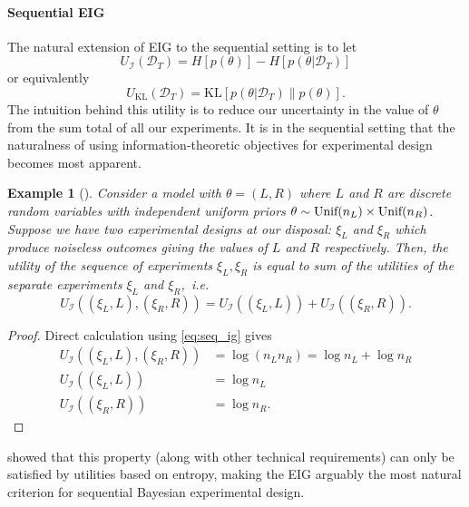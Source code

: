 \documentclass[a4paper, 10pt]{report}
\theoremstyle{plain}
\newtheorem{example}[theorem]{Example}
\begin{document}
	\paragraph{Sequential EIG}
	The natural extension of EIG to the sequential setting is to let \citep{foster2021dad}
	\begin{equation}
	\label{eq:seq_ig}
	U_\mathcal{I}(\mathcal{D}_T) = H[p(\theta)] - H[p(\theta|\mathcal{D}_T)]
	\end{equation}
	or equivalently \citep{huan2016sequential}
	\begin{equation}
	U_\text{KL}(\mathcal{D}_T) = \text{KL}[p(\theta|\mathcal{D}_T) \| p(\theta)].
	\end{equation}
	The intuition behind this utility is to reduce our uncertainty in the value of $\theta$ from the sum total of all our experiments.
	It is in the sequential setting that the naturalness of using information-theoretic objectives for experimental design becomes most apparent.
	\begin{example}[\citet{shannon1948mathematical,lindley1956}]
		\label{example:shannon}
		Consider a model with $\theta = (L,R)$ where $L$ and $R$ are discrete random variables with independent uniform priors $\theta \sim \textup{Unif}(n_L) \times \textup{Unif}(n_R)$.
		Suppose we have two experimental designs at our disposal: $\xi_L$ and $\xi_R$ which produce noiseless outcomes giving the values of $L$ and $R$ respectively.
		Then, the utility of the sequence of experiments $\xi_L,\xi_R$ is equal to sum of the utilities of the separate experiments $\xi_L$ and $\xi_R$,~i.e.
		\begin{equation}
		U_\mathcal{I}((\xi_L,L),(\xi_R,R)) = U_\mathcal{I}((\xi_L, L)) + U_\mathcal{I}((\xi_R, R)).
		\end{equation}
	\end{example}
	\begin{proof}
		Direct calculation using \eqref{eq:seq_ig} gives
		\begin{align}
		U_\mathcal{I}((\xi_L,L),(\xi_R,R)) &= \log (n_Ln_R) = \log n_L + \log n_R \\
		U_\mathcal{I}((\xi_L, L)) &= \log n_L \\
		U_\mathcal{I}((\xi_R, R)) &= \log n_R.
		\end{align}
	\end{proof}
	\citet{shannon1948mathematical} showed that this property (along with other technical requirements) can only be satisfied by utilities based on entropy, making the EIG arguably the most natural criterion for sequential Bayesian experimental design.
	
\end{document}
